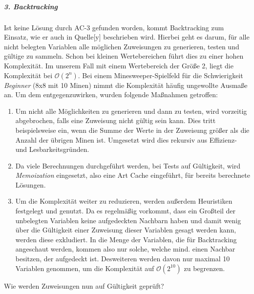 \subparagraph{3. Backtracking}

Ist keine Lösung durch AC-3 gefunden worden, kommt Backtracking zum Einsatz, wie er auch in Quelle[y] beschrieben wird. Hierbei geht es darum,
für alle nicht belegten Variablen alle möglichen Zuweisungen zu generieren, testen und gültige zu sammeln. Schon bei kleinen Wertebereichen
führt dies zu einer hohen Komplexität. Im unserem Fall mit einem Wertebereich der Größe 2, liegt die Komplexität bei $\mathcal{O}(2^n)$.
Bei einem Minesweeper-Spielfeld für die Schwierigkeit \textit{Beginner} (8x8 mit 10 Minen) nimmt die Komplexität häufig ungewollte Ausmaße an.
Um dem entgegenzuwirken, wurden folgende Maßnahmen getroffen:
\begin{enumerate}
    \item Um nicht alle Möglichkeiten zu generieren und dann zu testen, wird vorzeitig abgebrochen, falls eine Zuweisung nicht gültig sein
    kann. Dies tritt beispielsweise ein, wenn die Summe der Werte in der Zuweisung größer als die Anzahl der übrigen Minen ist. Umgesetzt wird
    dies rekursiv aus Effizienz- und Lesbarkeitsgründen.
    \item Da viele Berechnungen durchgeführt werden, bei Tests auf Gültigkeit, wird \textit{Memoization} eingesetzt, also eine Art Cache eingeführt,
    für bereits berechnete Lösungen. 
    \item Um die Komplexität weiter zu reduzieren, werden außerdem Heuristiken festgelegt und genutzt. Da es regelmäßig vorkommt, dass ein
    Großteil der unbelegten Variablen keine aufgedeckten Nachbarn haben und damit wenig über die Gültigkeit einer Zuweisung dieser Variablen
    gesagt werden kann, werden diese exkludiert. In die Menge der Variablen, die für Backtracking angeschaut werden, kommen also nur solche,
    welche mind. einen Nachbar besitzen, der aufgedeckt ist. Desweiteren werden davon nur maximal 10 Variablen genommen, um die Komplexität
    auf $\mathcal{O}(2^{10})$ zu begrenzen.
\end{enumerate}

Wie werden Zuweisungen nun auf Gültigkeit geprüft?

